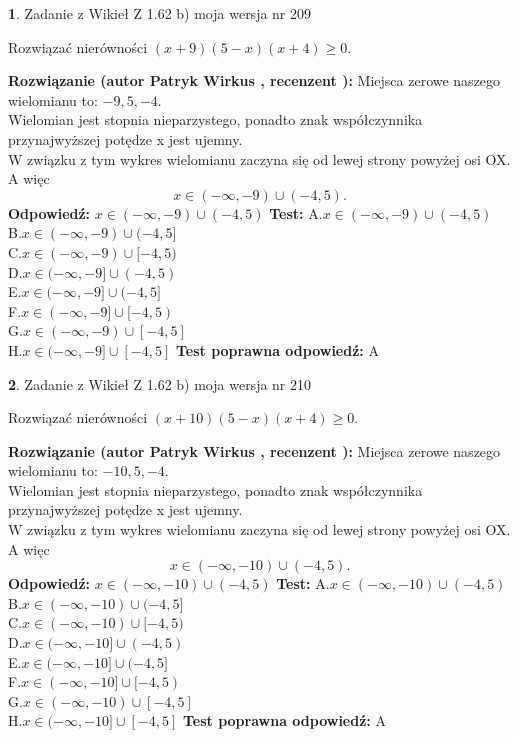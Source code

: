 \documentclass[12pt, a4paper]{article}
\theoremstyle{definition} %
\newtheorem{zad}{}
\newcommand{\zadStart}[1]{\begin{zad}#1\newline}
\newcommand{\zadStop}{\end{zad}}
\newcommand{\rozwStart}[2]{\noindent \textbf{Rozwiązanie (autor #1 , recenzent #2): }\newline}
\newcommand{\rozwStop}{\newline}
\newcommand{\odpStart}{\noindent \textbf{Odpowiedź:}\newline}
\newcommand{\odpStop}{\newline}
\newcommand{\testStart}{\noindent \textbf{Test:}\newline}
\newcommand{\testStop}{\newline}
\newcommand{\kluczStart}{\noindent \textbf{Test poprawna odpowiedź:}\newline}
\newcommand{\kluczStop}{\newline}
\begin{document}
\zadStart{Zadanie z Wikieł Z 1.62 b) moja wersja nr 209}

Rozwiązać nierówności $(x+9)(5-x)(x+4)\ge0$.
\zadStop
\rozwStart{Patryk Wirkus}{}
Miejsca zerowe naszego wielomianu to: $-9, 5, -4$.\\
Wielomian jest stopnia nieparzystego, ponadto znak współczynnika przy\linebreak najwyższej potędze x jest ujemny.\\ W związku z tym wykres wielomianu zaczyna się od lewej strony powyżej osi OX. A więc $$x \in (-\infty,-9) \cup (-4,5).$$
\rozwStop
\odpStart
$x \in (-\infty,-9) \cup (-4,5)$
\odpStop
\testStart
A.$x \in (-\infty,-9) \cup (-4,5)$\\
B.$x \in (-\infty,-9) \cup (-4,5]$\\
C.$x \in (-\infty,-9) \cup [-4,5)$\\
D.$x \in (-\infty,-9] \cup (-4,5)$\\
E.$x \in (-\infty,-9] \cup (-4,5]$\\
F.$x \in (-\infty,-9] \cup [-4,5)$\\
G.$x \in (-\infty,-9) \cup [-4,5]$\\
H.$x \in (-\infty,-9] \cup [-4,5]$
\testStop
\kluczStart
A
\kluczStop



\zadStart{Zadanie z Wikieł Z 1.62 b) moja wersja nr 210}

Rozwiązać nierówności $(x+10)(5-x)(x+4)\ge0$.
\zadStop
\rozwStart{Patryk Wirkus}{}
Miejsca zerowe naszego wielomianu to: $-10, 5, -4$.\\
Wielomian jest stopnia nieparzystego, ponadto znak współczynnika przy\linebreak najwyższej potędze x jest ujemny.\\ W związku z tym wykres wielomianu zaczyna się od lewej strony powyżej osi OX. A więc $$x \in (-\infty,-10) \cup (-4,5).$$
\rozwStop
\odpStart
$x \in (-\infty,-10) \cup (-4,5)$
\odpStop
\testStart
A.$x \in (-\infty,-10) \cup (-4,5)$\\
B.$x \in (-\infty,-10) \cup (-4,5]$\\
C.$x \in (-\infty,-10) \cup [-4,5)$\\
D.$x \in (-\infty,-10] \cup (-4,5)$\\
E.$x \in (-\infty,-10] \cup (-4,5]$\\
F.$x \in (-\infty,-10] \cup [-4,5)$\\
G.$x \in (-\infty,-10) \cup [-4,5]$\\
H.$x \in (-\infty,-10] \cup [-4,5]$
\testStop
\kluczStart
A
\kluczStop
\end{document}
